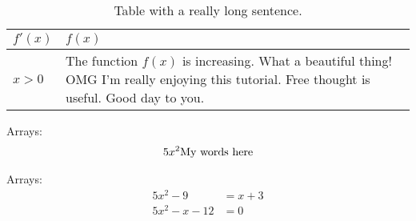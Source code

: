 \documentclass[12pt]{article}
\begin{document}
\begin{table}[H]
\centering %
\caption{Table with a really long sentence.} %
\def\arraystretch{1.5} %
\begin{tabular}{|l|p{2in}|} %
\hline
$f'(x)$ & $f(x)$ \\  %
\hline %
$x>0$ & The function $f(x)$ is increasing. What a beautiful thing! OMG I'm really enjoying this tutorial. Free thought is useful. Good day to you. \\
\hline
\end{tabular}
\end{table}

Arrays:
\begin{align}
5x^2 \space\text{My words here}
\end{align}

Arrays:
\begin{align*}
5x^2-9&=x+3\\
5x^2-x-12&=0
\end{align*}
\end{document}

